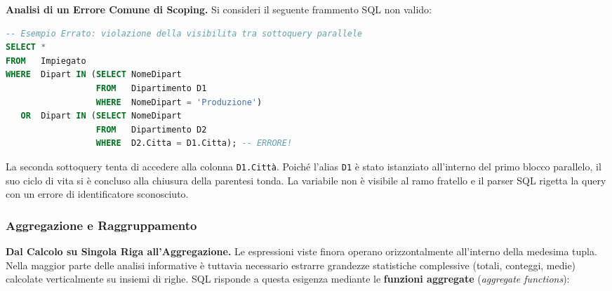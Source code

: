 \documentclass[12pt]{extarticle}
\begin{document}
\begin{center}
\begin{adjustbox}{max width=\linewidth}
\end{adjustbox}
\end{center}

\medskip
\noindent \textbf{Analisi di un Errore Comune di Scoping.} Si consideri il seguente frammento SQL non valido:
\begin{lstlisting}[language=SQL]
-- Esempio Errato: violazione della visibilita tra sottoquery parallele
SELECT *
FROM   Impiegato
WHERE  Dipart IN (SELECT NomeDipart 
                  FROM   Dipartimento D1 
                  WHERE  NomeDipart = 'Produzione')
   OR  Dipart IN (SELECT NomeDipart 
                  FROM   Dipartimento D2 
                  WHERE  D2.Citta = D1.Citta); -- ERRORE!
\end{lstlisting}
La seconda sottoquery tenta di accedere alla colonna \texttt{D1.Città}. Poiché l'alias \texttt{D1} è stato istanziato all'interno del primo blocco parallelo, il suo ciclo di vita si è concluso alla chiusura della parentesi tonda. La variabile non è visibile al ramo fratello e il parser SQL rigetta la query con un errore di identificatore sconosciuto.

\subsubsection{Aggregazione e Raggruppamento}
\noindent \textbf{Dal Calcolo su Singola Riga all'Aggregazione.} Le espressioni viste finora operano orizzontalmente all'interno della medesima tupla. Nella maggior parte delle analisi informative è tuttavia necessario estrarre grandezze statistiche complessive (totali, conteggi, medie) calcolate verticalmente su insiemi di righe. SQL risponde a questa esigenza mediante le \textbf{funzioni aggregate} (\textit{aggregate functions}):
\end{document}
